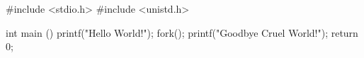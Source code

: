\documentclass[varwidth=18em,crop]{standalone}
\begin{document}
\begin{ccode}
#include <stdio.h>
#include <unistd.h>

int main ()
{
  printf("Hello World!\n");
  fork();
  printf("Goodbye Cruel World!\n");
  return 0;
}
\end{ccode}
\end{document}

